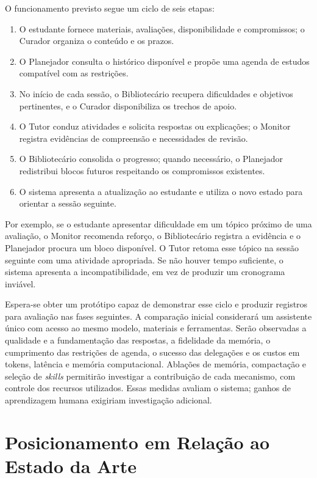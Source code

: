 \documentclass[12pt]{article}
\begin{document}
O funcionamento previsto segue um ciclo de seis etapas:
\begin{enumerate}
    \item O estudante fornece materiais, avaliações, disponibilidade e compromissos; o Curador organiza o conteúdo e os prazos.
    \item O Planejador consulta o histórico disponível e propõe uma agenda de estudos compatível com as restrições.
    \item No início de cada sessão, o Bibliotecário recupera dificuldades e objetivos pertinentes, e o Curador disponibiliza os trechos de apoio.
    \item O Tutor conduz atividades e solicita respostas ou explicações; o Monitor registra evidências de compreensão e necessidades de revisão.
    \item O Bibliotecário consolida o progresso; quando necessário, o Planejador redistribui blocos futuros respeitando os compromissos existentes.
    \item O sistema apresenta a atualização ao estudante e utiliza o novo estado para orientar a sessão seguinte.
\end{enumerate}

Por exemplo, se o estudante apresentar dificuldade em um tópico próximo de uma avaliação, o Monitor recomenda reforço, o Bibliotecário registra a evidência e o Planejador procura um bloco disponível. O Tutor retoma esse tópico na sessão seguinte com uma atividade apropriada. Se não houver tempo suficiente, o sistema apresenta a incompatibilidade, em vez de produzir um cronograma inviável.

Espera-se obter um protótipo capaz de demonstrar esse ciclo e produzir registros para avaliação nas fases seguintes. A comparação inicial considerará um assistente único com acesso ao mesmo modelo, materiais e ferramentas. Serão observadas a qualidade e a fundamentação das respostas, a fidelidade da memória, o cumprimento das restrições de agenda, o sucesso das delegações e os custos em tokens, latência e memória computacional. Ablações de memória, compactação e seleção de \textit{skills} permitirão investigar a contribuição de cada mecanismo, com controle dos recursos utilizados. Essas medidas avaliam o sistema; ganhos de aprendizagem humana exigiriam investigação adicional.

\section{Posicionamento em Relação ao Estado da Arte}
\label{sec:estado_da_arte}
\end{document}
